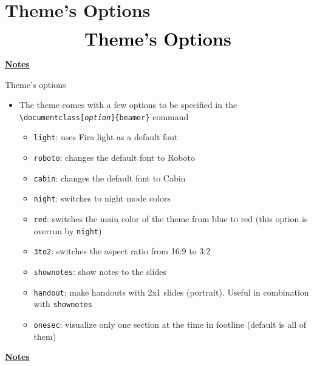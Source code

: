 \documentclass[10pt]{beamer}
\begin{document}
\section[Options]{Theme's Options}
\begin{frame}
    \begin{eqnarray*}
        &\text{{\huge \textbf{Theme's Options}}}\\
    \end{eqnarray*}
\end{frame}
\begin{flushleft}
    \underline{\textbf{Notes}}\setlength{\parskip}{.15cm}\notesize\newline\par
\end{flushleft}

\begin{frame}
    {Theme's options}
    \begin{itemize}
        \item The theme comes with a few options to be specified in the \texttt{\textbackslash documentclass[\textit{option}]\{beamer\}} command \medskip
        \begin{itemize}
            \item \texttt{light}: uses Fira light as a default font\medskip
            \item \texttt{roboto}: changes the default font to Roboto\medskip
            \item \texttt{cabin}: changes the default font to Cabin\medskip
            \item \texttt{night}: switches to night mode colors \medskip
            \item \texttt{red}: switches the main color of the theme from blue to red (this option is overrun by \texttt{night})\medskip
            \item \texttt{3to2}: switches the aspect ratio from 16:9 to 3:2\medskip
            \item \texttt{shownotes}: show notes to the slides \medskip
            \item \texttt{handout}: make handouts with 2x1 slides (portrait). Useful in combination with \texttt{shownotes}\medskip
            \item \texttt{onesec}: visualize only one section at the time in footline (default is all of them)
        \end{itemize}
    \end{itemize}
\end{frame}
\begin{flushleft}
    \underline{\textbf{Notes}}\setlength{\parskip}{.15cm}\notesize\newline\par
\end{flushleft}
\end{document}
